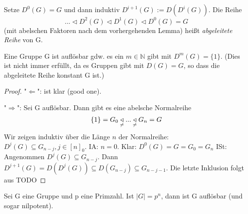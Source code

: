 \documentclass[../main.tex]{subfiles}
\begin{document}
\begin{definition}
    Setze $D^0(G) = G$ und dann induktiv $D^{i+1}(G) := D(D^i(G))$. Die Reihe 
    $$... \triangleleft D^2(G) \triangleleft D^1(G) \triangleleft D^0(G) = G$$
    (mit abelschen Faktoren nach dem vorhergehenden Lemma) heißt \emph{abgeleitete Reihe} von G.
\end{definition}
\begin{theorem}
    Eine Gruppe G ist auflösbar gdw. es ein $m \in \mathbb{N}$ gibt mit $D^m(G) = \{1\}$. (Dies ist nicht immer erfüllt, da es Gruppen gibt mit $D(G) = G$, so dass die abgeleitete Reihe konstant G ist.)
\end{theorem}
\begin{proof}
    "$\Leftarrow$": ist klar (good one).

    "$\Rightarrow$": Sei G auflösbar. Dann gibt es eine abelsche Normalreihe
    $$\{1\} = G_0 \underset{\neq}{\triangleleft} ... \underset{\neq}{\triangleleft} G_n = G$$
    Wir zeigen induktiv über die Länge $n$ der Normalreihe: $D^j(G) \subseteq G_{n-j}, j \in [n]_0$.
    IA: $n=0$. Klar: $D^0(G) = G = G_0 = G_n$
    ISt: Angenommen $D^j(G) \subseteq G_{n-j}$. Dann $D^{j+1}(G) = D(D^j(G)) \subseteq D(G_{n-j}) \subseteq G_{n-j-1}$. Die letzte Inklusion folgt aus TODO
\end{proof}
\begin{example}
    Sei G eine Gruppe und p eine Primzahl. Ist $|G| = p^n$, dann ist G auflösbar (und sogar nilpotent).
\end{example}
\end{document}
